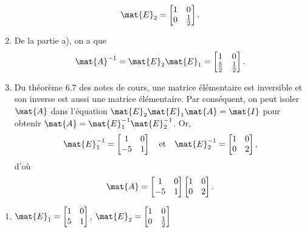 \begin{exercice}
\begin{sol}
\begin{enumerate}
\begin{displaymath}
        \mat{E}_2 = \begin{bmatrix} 1&0 \\ 0&\frac{1}{2} \end{bmatrix}.
      \end{displaymath}
    \item De la partie a), on a que
      \begin{displaymath}
        \mat{A}^{-1} = \mat{E}_2 \mat{E}_1 =
        \begin{bmatrix} 1 & 0 \\ \frac{5}{2} & \frac{1}{2} \end{bmatrix}.
      \end{displaymath}
    \item Du théorème 6.7 des notes de cours, une matrice élémentaire
      est inversible et son inverse est aussi une matrice élémentaire.
      Par conséquent, on peut isoler $\mat{A}$ dans l'équation
      $\mat{E}_2 \mat{E}_1 \mat{A} = \mat{I}$ pour obtenir $\mat{A} =
      \mat{E}_1^{-1} \mat{E}_2^{-1}$. Or,
      \begin{displaymath}
        \mat{E}_1^{-1} =
        \begin{bmatrix} 1&0 \\ -5&1 \end{bmatrix} \quad
        \text{et} \quad
        \mat{E}_2^{-1} = \begin{bmatrix} 1&0 \\ 0&2 \end{bmatrix},
      \end{displaymath}
      d'où
      \begin{displaymath}
        \mat{A} =
        \begin{bmatrix} 1&0 \\ -5&1 \end{bmatrix}
        \begin{bmatrix} 1&0 \\  0&2 \end{bmatrix}.
      \end{displaymath}
    \end{enumerate}
  \end{sol}
  \begin{rep}
    \begin{enumerate}
    \item $\mat{E}_1 = \begin{bmatrix} 1&0 \\ 5&1 \end{bmatrix}$,
      $\mat{E}_2 = \begin{bmatrix} 1&0 \\ 0&\frac{1}{2} \end{bmatrix}$
    \end{enumerate}
  \end{rep}
\end{exercice}

